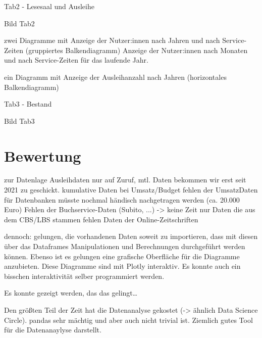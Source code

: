    
    
    Tab2 - Lesesaal und Ausleihe
    
    Bild Tab2
    
    zwei Diagramme mit
        Anzeige der Nutzer:innen nach Jahren und nach Service-Zeiten (gruppiertes Balkendiagramm)
        Anzeige der Nutzer:innen nach Monaten und nach Service-Zeiten für das laufende Jahr.
        
     ein Diagramm mit
        Anzeige der Ausleihanzahl nach Jahren (horizontales Balkendiagramm)
    
    Tab3 - Bestand
    
    Bild Tab3

    
     



\section{Bewertung}
zur Datenlage 
Ausleihdaten nur auf Zuruf, mtl. Daten bekommen wir erst seit 2021 zu geschickt.
kumulative Daten bei Umsatz/Budget
fehlen der UmsatzDaten für Datenbanken müsste nochmal händisch nachgetragen werden (ca. 20.000 Euro)
Fehlen der Buchservice-Daten (Subito, ...) -> keine Zeit
nur Daten die aus dem CBS/LBS  stammen
fehlen Daten der Online-Zeitschriften

dennoch:
gelungen, die vorhandenen Daten soweit zu importieren, dass mit diesen über das Dataframes Manipulationen und Berechnungen
durchgeführt werden können. Ebenso ist es gelungen eine grafische Oberfläche für die Diagramme anzubieten. Diese Diagramme
sind mit Plotly interaktiv. Es konnte auch ein bisschen interaktivität selber programmiert werden.

Es konnte gezeigt werden, das das gelingt\dots

Den größten Teil der Zeit hat die Datenanalyse gekostet (-> ähnlich Data Science Circle). 
pandas sehr mächtig und aber auch nicht trivial ist. Ziemlich gutes Tool für die Datenanaylyse darstellt.


